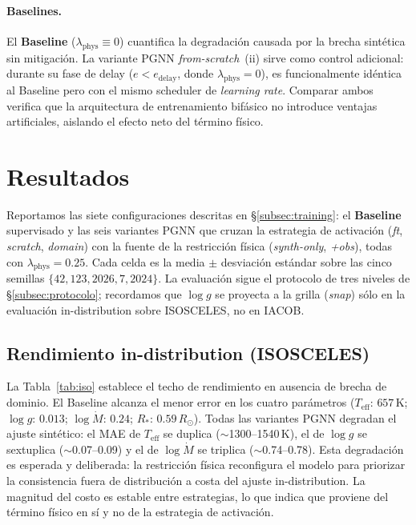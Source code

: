\documentclass[sigconf,ACM]{acmart}
\begin{document}
\paragraph{Baselines.}
El \textbf{Baseline} ($\lambda_{\mathrm{phys}} \equiv 0$) cuantifica la
degradación causada por la brecha sintética sin mitigación. La variante PGNN
\emph{from-scratch}~(ii) sirve como control adicional: durante su fase de
delay ($e < e_{\mathrm{delay}}$, donde $\lambda_{\mathrm{phys}} = 0$), es
funcionalmente idéntica al Baseline pero con el mismo scheduler de
\emph{learning rate}. Comparar ambos verifica que la arquitectura de
entrenamiento bifásico no introduce ventajas artificiales, aislando el efecto neto
del término físico.


\section{Resultados}
\label{sec:resultados}

Reportamos las siete configuraciones descritas en §\ref{subsec:training}: el
\textbf{Baseline} supervisado y las seis variantes PGNN que cruzan la estrategia
de activación (\emph{ft}, \emph{scratch}, \emph{domain}) con la fuente de la
restricción física (\emph{synth-only}, \emph{+obs}), todas con
$\lambda_\mathrm{phys}=0.25$. Cada celda es la media $\pm$ desviación estándar
sobre las cinco semillas $\{42, 123, 2026, 7, 2024\}$. La evaluación sigue el protocolo de
tres niveles de §\ref{subsec:protocolo}; recordamos que $\log g$ se proyecta a la
grilla (\emph{snap}) sólo en la evaluación in-distribution sobre ISOSCELES, no en
IACOB.

\subsection{Rendimiento in-distribution (ISOSCELES)}

La Tabla~\ref{tab:iso} establece el techo de rendimiento en ausencia de brecha de
dominio. El Baseline alcanza el menor error en los cuatro parámetros
($T_\mathrm{eff}$: $657$\,K; $\log g$: $0.013$; $\log\dot{M}$: $0.24$;
$R_*$: $0.59\,R_\odot$). Todas las variantes PGNN degradan el ajuste sintético: el
MAE de $T_\mathrm{eff}$ se duplica ($\sim$1300--1540\,K), el de $\log g$ se
sextuplica ($\sim$0.07--0.09) y el de $\log\dot{M}$ se triplica ($\sim$0.74--0.78).
Esta degradación es esperada y deliberada: la restricción física reconfigura el
modelo para priorizar la consistencia fuera de distribución a costa del ajuste
in-distribution. La magnitud del costo es estable entre estrategias, lo que indica
que proviene del término físico en sí y no de la estrategia de activación.
\end{document}
